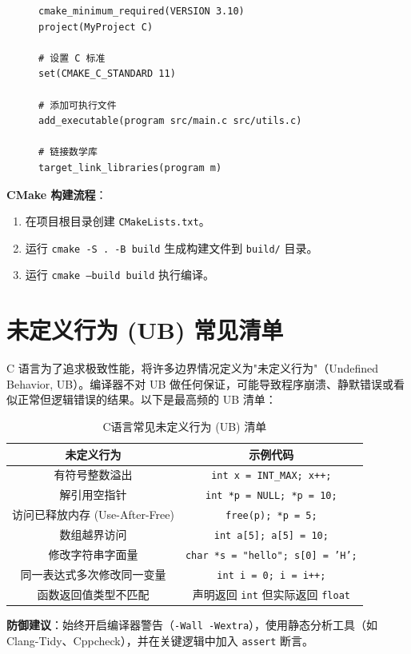 \begin{figure}[H]
\centering
\begin{minipage}{0.95\textwidth}
\begin{lstlisting}[caption={CMakeLists.txt 基础示例}]
cmake_minimum_required(VERSION 3.10)
project(MyProject C)

# 设置 C 标准
set(CMAKE_C_STANDARD 11)

# 添加可执行文件
add_executable(program src/main.c src/utils.c)

# 链接数学库
target_link_libraries(program m)
\end{lstlisting}
\end{minipage}
\end{figure}

\textbf{CMake 构建流程}：
\begin{enumerate}
    \item 在项目根目录创建 \texttt{CMakeLists.txt}。
    \item 运行 \texttt{cmake -S . -B build} 生成构建文件到 \texttt{build/} 目录。
    \item 运行 \texttt{cmake --build build} 执行编译。
\end{enumerate}

\section{未定义行为 (UB) 常见清单}

C 语言为了追求极致性能，将许多边界情况定义为"未定义行为"（Undefined Behavior, UB）。编译器不对 UB 做任何保证，可能导致程序崩溃、静默错误或看似正常但逻辑错误的结果。以下是最高频的 UB 清单：

\begin{table}[H]
\centering
\small
\renewcommand{\arraystretch}{1.5}
\begin{tabulary}{\linewidth}{CC}
\toprule
\textbf{未定义行为} & \textbf{示例代码} \\ \midrule
有符号整数溢出 & \texttt{int x = INT\_MAX; x++;} \\ 
解引用空指针 & \texttt{int *p = NULL; *p = 10;} \\ 
访问已释放内存 (Use-After-Free) & \texttt{free(p); *p = 5;} \\ 
数组越界访问 & \texttt{int a[5]; a[5] = 10;} \\ 
修改字符串字面量 & \texttt{char *s = "hello"; s[0] = 'H';} \\ 
同一表达式多次修改同一变量 & \texttt{int i = 0; i = i++;} \\ 
函数返回值类型不匹配 & 声明返回 \texttt{int} 但实际返回 \texttt{float} \\ \bottomrule
\end{tabulary}
\caption{C语言常见未定义行为 (UB) 清单}
\label{tab:ub_list}
\end{table}

\textbf{防御建议}：始终开启编译器警告（\texttt{-Wall -Wextra}），使用静态分析工具（如 Clang-Tidy、Cppcheck），并在关键逻辑中加入 \texttt{assert} 断言。

